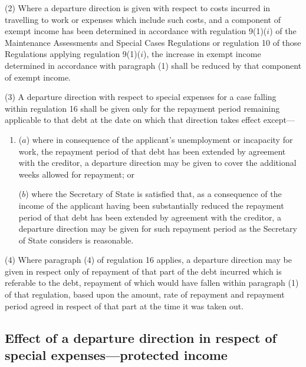 \documentclass[a4paper]{article}
\begin{document}
(2) Where a departure direction is given with respect to costs incurred in
travelling to work or expenses which include such costs, and a component of
exempt income has been determined in accordance with regulation 9(1)($i$) of the
Maintenance Assessments and Special Cases Regulations or regulation 10 of those
Regulations applying regulation 9(1)($i$), the increase in exempt income
determined in accordance with paragraph (1) shall be reduced by that component
of exempt income.

(3) A departure direction with respect to special expenses for a case falling
within regulation 16 shall be given only for the repayment period remaining
applicable to that debt at the date on which that direction takes effect except—
\begin{enumerate}\item[]
($a$) where in consequence of the applicant’s unemployment or incapacity for work,
the repayment period of that debt has been extended by agreement with the
creditor, a departure direction may be given to cover the additional weeks
allowed for repayment; or

($b$) where the Secretary of State is satisfied that, as a consequence of the
income of the applicant having been substantially reduced the repayment period
of that debt has been extended by agreement with the creditor, a departure
direction may be given for such repayment period as the Secretary of State
considers is reasonable.
\end{enumerate}

(4) Where paragraph (4) of regulation 16 applies, a departure direction may be
given in respect only of repayment of that part of the debt incurred which is
referable to the debt, repayment of which would have fallen within paragraph (1)
of that regulation, based upon the amount, rate of repayment and repayment
period agreed in respect of that part at the time it was taken out.

\subsection[38. Effect of a departure direction in respect of special expenses—\hspace{0pt}protected
income]{Effect of a departure direction in respect of special expenses—\hspace{0pt}protected
income}
\end{document}
